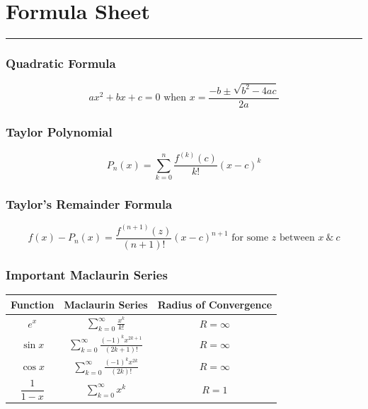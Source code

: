 \documentclass[11pt]{exam}
\newcommand{\ds}{\displaystyle}
\begin{document}
\pagestyle{empty}
\section*{Formula Sheet} 

\hrule 
\bigskip

\subsubsection*{Quadratic Formula} 
$$\ds ax^2+bx+c = 0 \text{ when }  x = \frac{-b \pm \sqrt{b^2 - 4ac}}{2a}$$


\noindent
\subsubsection*{Taylor Polynomial}
$$P_n(x) = \sum_{k = 0}^n \frac{f^{(k)}(c)}{k!} (x - c)^k$$

\subsubsection*{Taylor's Remainder Formula}
$$f(x) - P_n(x) = \frac{f^{(n+1)}(z)}{(n+1)!} (x-c)^{n+1} \text{ for some } z \text{ between } x ~\&~ c$$



\subsubsection*{Important Maclaurin Series}
\renewcommand{\arraystretch}{3.0} %
\begin{center}
\begin{tabular}{|c|c|c|}
\hline
Function & Maclaurin Series & Radius of Convergence \\
\hline
$e^x$ & $\ds \sum_{k=0}^{\infty} \frac{x^k}{k!}$ & $R= \infty$ \\ \hline
$\sin x$ & $\ds \sum_{k=0}^\infty \frac{(-1)^k x^{2k+1}}{(2k+1)!}$ & $R= \infty$ \\ \hline
$\cos x$ & $\ds \sum_{k=0}^\infty \frac{(-1)^k x^{2k}}{(2k)!}$ & $R= \infty$ \\ \hline
$ \dfrac{1}{1-x}$ & $\ds \sum_{k=0}^\infty x^k$ & $R = 1$ \\ \hline
\end{tabular}
\end{center}
\end{document}
